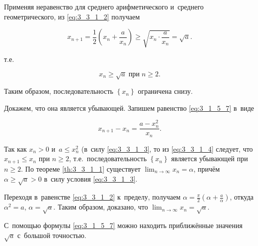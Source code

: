 Применяя неравенство для среднего арифметического и~среднего геометрического,
из \eqref{eq:3_3_1_2} получаем

\begin{equation*}
\displaystyle x_{n+1} =
\frac{1}{2} \left( x_{n} + \frac{a}{x_{n}} \right)
\geqslant \sqrt{x_{n} \cdot \frac{a}{x_{n}}} =
\sqrt{a}.
\end{equation*}

\noindent
т.е.\

\begin{equation}\label{eq:3_3_1_3}
x_{n} \geqslant \sqrt{a} \; \text{при} \; n \geqslant 2.
\end{equation}

\noindent
Таким образом, последовательность $\left\{ x_{n} \right\}$ ограничена снизу.

Докажем, что она является убывающей. Запишем равенство \eqref{eq:3_1_5_7}
в~виде

\begin{equation}\label{eq:3_3_1_4}
\displaystyle x_{n+1} - x_{n} = \frac{a - x_{n}^{2}}{x_{n}}.
\end{equation}

\noindent
Так как $x_{n} > 0$ и~$a \leqslant x_{n}^{2}$ (в~силу \eqref{eq:3_3_1_3},
то из \eqref{eq:3_3_1_4} следует, что $x_{n+1} \leqslant x_{n}$ при $n \geqslant 2$,
т.е.\ последовательность $\left\{ x_{n} \right\}$ является убывающей
при $n \geqslant 2$.
По теореме \ref{th:3_3_1_1} существует
$\displaystyle \lim_{n \to \infty} x_{n} = \alpha$,
причём $\alpha \geqslant \sqrt{a} > 0$ в~силу условия \eqref{eq:3_3_1_3}.

Переходя в~равенстве \eqref{eq:3_3_1_2} к~пределу, получаем
$\displaystyle \alpha = \frac{\pi}{2} \left( \alpha + \frac{a}{\alpha} \right)$,
откуда $\alpha^{2} = a$, $\alpha = \sqrt{a}$.
Таким образом, доказано, что $\displaystyle \lim_{n \to \infty} x_{n} = \sqrt{a}$.

\begin{Note}\label{nt:3_3_1_2} С~помощью формулы \eqref{eq:3_1_5_7} можно находить
приближённые значения $\sqrt{a}$ с~большой точностью.
\end{Note}
